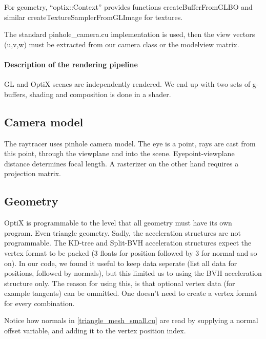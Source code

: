 For geometry, ``optix::Context'' provides functions createBufferFromGLBO and similar createTextureSamplerFromGLImage for textures.

The standard pinhole\_camera.cu implementation is used, then the view vectors (u,v,w) must be extracted from our camera class or the modelview matrix.

\paragraph{Description of the rendering pipeline}

GL and OptiX scenes are independently rendered. We end up with two sets of g-buffers, shading and composition is done in a shader.

\subsection{Camera model}
The raytracer uses pinhole camera model. The eye is a point, rays are cast from this point, through the viewplane and into the scene. Eyepoint-viewplane distance determines focal length. A rasterizer on the other hand requires a projection matrix.

\subsection{Geometry}

OptiX is programmable to the level that all geometry must have its own program. Even triangle geometry. Sadly, the acceleration structures are not programmable. The KD-tree and Split-BVH acceleration structures expect the vertex format to be packed (3 floats for position followed by 3 for normal and so on). In our code, we found it useful to keep data seperate (list all data for positions, followed by normals), but this limited us to using the BVH acceleration structure only. The reason for using this, is that optional vertex data (for example tangents) can be ommitted. One doesn't need to create a vertex format for every combination.



Notice how normals in \autoref{triangle_mesh_small.cu} are read by supplying a normal offset variable, and adding it to the vertex position index.